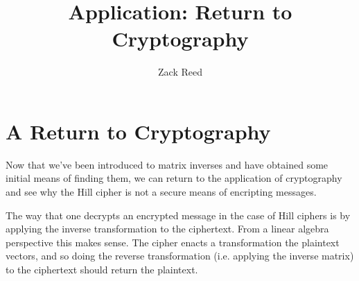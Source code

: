 \documentclass{ximera}
\author{Zack Reed}
\title{Application: Return to Cryptography}
\begin{document}
\begin{abstract}

\end{abstract}
\maketitle


\section*{A Return to Cryptography}

Now that we've been introduced to matrix inverses and have obtained some initial means of finding them, we can return to the application of cryptography and see why the Hill cipher is not a secure means of encripting messages.

The way that one decrypts an encrypted message in the case of Hill ciphers is by applying the inverse transformation to the ciphertext. From a linear algebra perspective this makes sense. The cipher enacts a transformation the plaintext vectors, and so doing the reverse transformation (i.e. applying the inverse matrix) to the ciphertext should return the plaintext.

\begin{center}
\end{center}
\end{document}

